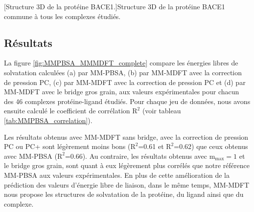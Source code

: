 \begin{center}
    \captionsetup{type=figure}
	[Structure 3D de la protéine BACE1.]{Structure 3D de la protéine BACE1 commune à tous les complexes étudiés.}
    \label{fig:structure_proteine_MMPBSA}
\end{center}









\subsection{Résultats}

La figure \ref{fig:MMPBSA_MMMDFT_complete} compare les énergies libres de solvatation calculées (a) par MM-PBSA, (b) par MM-MDFT avec la correction de pression PC, (c) par MM-MDFT avec la correction de pression PC et (d) par MM-MDFT avec le bridge gros grain, aux valeurs expérimentales pour chacun des 46 complexes protéine-ligand étudiés. Pour chaque jeu de données, nous avons ensuite calculé le coefficient de corrélation $\mathrm{R}^2$ (voir tableau \ref{tab:MMPBSA_correlation}). 



Les résultats obtenus avec MM-MDFT sans bridge, avec la correction de pression PC ou PC+ sont légèrement moins bons ($\mathrm{R}^2$=0.61 et $\mathrm{R}^2$=0.62) que ceux obtenus avec MM-PBSA ($\mathrm{R}^2$=0.66). Au contraire, les résultats obtenus avec $\mathrm{m}_\mathrm{max}=1$ et le bridge gros grain, sont quant à eux légèrement plus corrélés que notre référence MM-PBSA aux valeurs expérimentales. En plus de cette amélioration de la prédiction des valeurs d'énergie libre de liaison, dans le même temps, MM-MDFT nous propose les structures de solvatation de la protéine, du ligand ainsi que du complexe.

